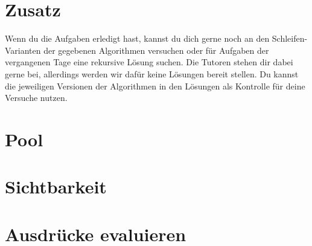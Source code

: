 \documentclass[accentcolor=tud3c,colorbacktitle,12pt]{tudexercise}
\newcounter{ex}\setcounter{ex}{1}
\begin{document}
	\section{Zusatz}
		Wenn du die Aufgaben erledigt hast, kannst du dich gerne noch an den Schleifen-Varianten der gegebenen Algorithmen versuchen oder für Aufgaben der vergangenen Tage eine rekursive Lösung suchen. Die Tutoren stehen dir dabei gerne bei, allerdings werden wir dafür keine Lösungen bereit stellen. Du kannst die jeweiligen Versionen der Algorithmen in den Lösungen als Kontrolle für deine Versuche nutzen.
\or%
	\section{Pool}
	\section{Sichtbarkeit}
	\section{Ausdrücke evaluieren}
\else\fi
\end{document}
